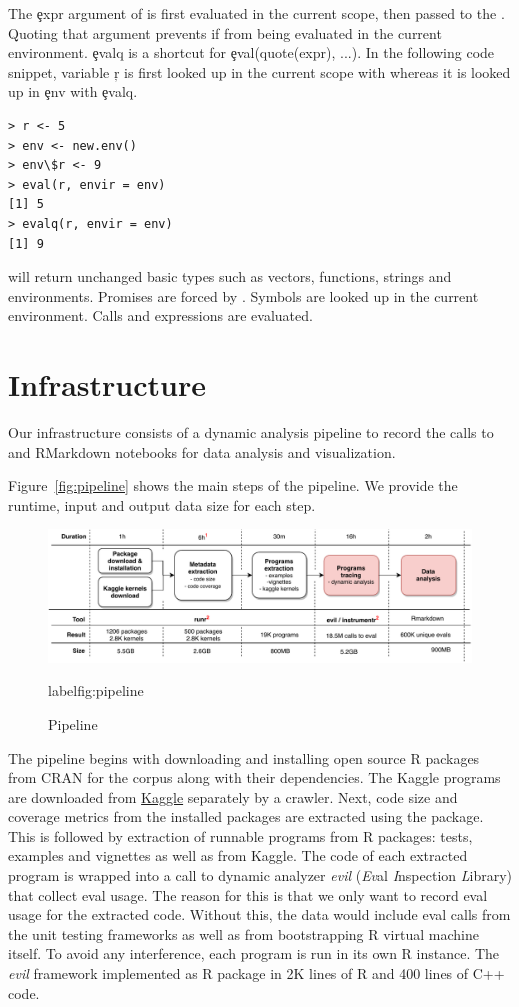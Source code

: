 \documentclass[conference]{IEEEtran}
\begin{document}
The \c{expr} argument of \eval is first evaluated in the current scope, then passed to the \eval. Quoting that argument prevents if from being evaluated in the current environment. \c{evalq} is a shortcut for \c{eval(quote(expr), ...)}. In the following code snippet, variable \c{r} is first looked up in the current scope with \eval whereas it is looked up in \c{env} with \c{evalq}.

\begin{lstlisting}
> r <- 5
> env <- new.env()
> env\$r <- 9
> eval(r, envir = env)
[1] 5
> evalq(r, envir = env)
[1] 9
\end{lstlisting}

\eval will return unchanged basic types such as vectors, functions, strings and environments. Promises are forced by \eval. Symbols are looked up in the current environment. Calls and expressions are evaluated. 


\section{Infrastructure}

Our infrastructure consists of a dynamic analysis pipeline to record the calls
to \eval and RMarkdown notebooks for data analysis and visualization.

Figure~\ref{fig:pipeline} shows the main steps of the pipeline. We provide the
runtime, input and output data size for each step.

\begin{figure}[!tb]\centering\includegraphics[width=\linewidth]
{pipeline.pdf}\caption{Pipeline}label{fig:pipeline}
\end{figure}

The pipeline begins with downloading and installing open source R packages from
CRAN for the corpus along with their dependencies. The Kaggle programs are
downloaded from \href{http://www.kaggle.com}{Kaggle} separately by a crawler.
Next, code size and coverage metrics from the installed packages are extracted
using the \href{ https://github.com/r-lib/covr}{\covr} package. This is followed
by extraction of runnable programs from R packages: tests, examples and
vignettes as well as from Kaggle. The code of each extracted program is wrapped
into a call to dynamic analyzer \emph{evil} (\emph{Ev}al \emph{I}nspection
\emph{L}ibrary) that collect eval usage. The reason for this is that we only
want to record eval usage for the extracted code. Without this, the data would
include eval calls from the unit testing frameworks as well as from
bootstrapping R virtual machine itself. To avoid any interference, each program
is run in its own R instance. The \emph{evil} framework implemented as R package
in 2K lines of R and 400 lines of C++ code.
\end{document}
